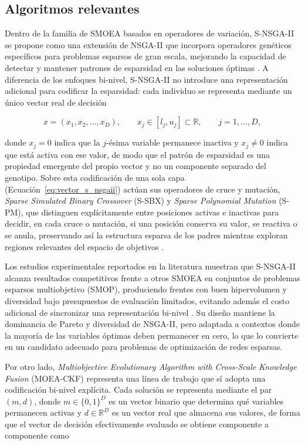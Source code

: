 \subsection{Algoritmos relevantes}\label{subsec:algoritmos_relevantes}
Dentro de la familia de SMOEA basados en operadores de variación, S-NSGA-II se propone como una extensión de NSGA-II que incorpora operadores genéticos específicos para problemas esparsos de gran escala, mejorando la capacidad de detectar y mantener patrones de esparsidad en las soluciones óptimas \cite{10066873_S-NSGA-II, Shao2025_SMOEA}. A diferencia de los enfoques bi-nivel, S-NSGA-II no introduce una representación adicional para codificar la esparsidad: cada individuo se representa mediante un único vector real de decisión

\begin{equation}
x = (x_1, x_2, \ldots, x_D), \qquad x_j \in [l_j, u_j] \subset \mathbb{R}, \qquad j = 1,\ldots,D,
\label{eq:vector_s_nsgaii}
\end{equation}

donde $x_j = 0$ indica que la $j$-ésima variable permanece inactiva y $x_j \neq 0$ indica que está activa con ese valor, de modo que el patrón de esparsidad es una propiedad emergente del propio vector y no un componente separado del genotipo. Sobre esta codificación de una sola capa (Ecuación~\ref{eq:vector_s_nsgaii}) actúan sus operadores de cruce y mutación, \textit{Sparse Simulated Binary Crossover} (S-SBX) y \textit{Sparse Polynomial Mutation} (S-PM), que distinguen explícitamente entre posiciones activas e inactivas para decidir, en cada cruce o mutación, si una posición conserva su valor, se reactiva o se anula, preservando así la estructura esparsa de los padres mientras exploran regiones relevantes del espacio de objetivos \cite{10066873_S-NSGA-II}.

Los estudios experimentales reportados en la literatura muestran que S-NSGA-II alcanza resultados competitivos frente a otros SMOEA en conjuntos de problemas esparsos multiobjetivo (SMOP), produciendo frentes con buen hipervolumen y diversidad bajo presupuestos de evaluación limitados, evitando además el costo adicional de sincronizar una representación bi-nivel \cite{10066873_S-NSGA-II}. Su diseño mantiene la dominancia de Pareto y diversidad de NSGA-II, pero adaptada a contextos donde la mayoría de las variables óptimas deben permanecer en cero, lo que lo convierte en un candidato adecuado para problemas de optimización de redes esparsas.

Por otro lado, \textit{Multiobjective Evolutionary Algorithm with Cross-Scale Knowledge Fusion} (MOEA-CKF) \cite{MOEA/CKF} representa una línea de trabajo que sí adopta una codificación bi-nivel explícita. Cada solución se representa mediante el par $(m, d)$, donde $m \in \{0,1\}^D$ es un vector binario que determina qué variables permanecen activas y $d \in \mathbb{R}^D$ es un vector real que almacena sus valores, de forma que el vector de decisión efectivamente evaluado se obtiene componente a componente como


